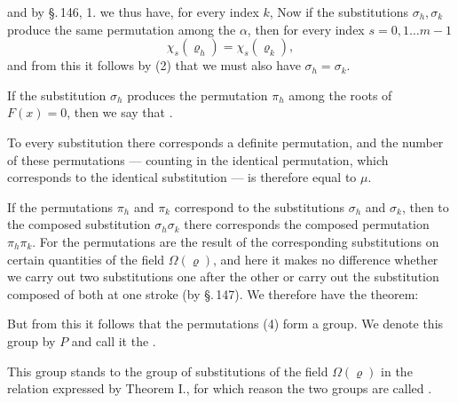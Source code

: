 
and by \S.\,146, 1. we thus have, for every index $k$,
Now if the substitutions $\sigma_h, \sigma_k$ produce the same permutation among the $\alpha$, then for every index $s = 0, 1 \ldots m-1$
\[
\chi_s(\varrho_h) = \chi_s(\varrho_k),
\]
and from this it follows by (2) that we must also have $\sigma_h = \sigma_k$.

If the substitution $\sigma_h$ produces the permutation $\pi_h$ among the roots of $F(x) = 0$, then we say that .

To every substitution there corresponds a definite permutation, and the number of these permutations — counting in the identical permutation, which corresponds to the identical substitution — is therefore equal to $\mu$.

If the permutations $\pi_h$ and $\pi_k$ correspond to the substitutions $\sigma_h$ and $\sigma_k$, then to the composed substitution $\sigma_h \sigma_k$ there corresponds the composed permutation $\pi_h \pi_k$. For the permutations are the result of the corresponding substitutions on certain quantities of the field $\Omega(\varrho)$, and here it makes no difference whether we carry out two substitutions one after the other or carry out the substitution composed of both at one stroke (by \S.\,147). We therefore have the theorem:


But from this it follows that the permutations (4) form a group. We denote this group by $P$ and call it the .

This group stands to the group of substitutions of the field $\Omega(\varrho)$ in the relation expressed by Theorem I., for which reason the two groups are called .
